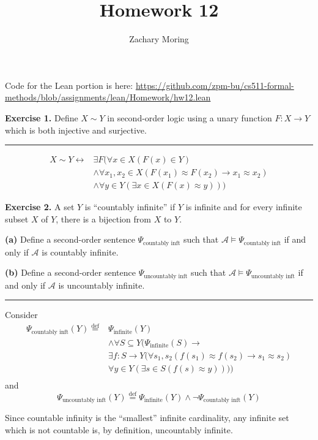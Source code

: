 \documentclass{article}
\title{Homework 12}
\author{Zachary Moring}
\newcommand{\Break}{\vspace{0.2cm}\hrule{}\vspace{0.2cm}}
\newcommand{\defas}{\overset{\text{def}}{=}}
\begin{document}
 \maketitle

Code for the Lean portion is here:
\url{https://github.com/zpm-bu/cs511-formal-methods/blob/assignments/lean/Homework/hw12.lean}

\vspace{2cm}

\noindent\textbf{Exercise 1.} Define $X \sim Y$ in second-order logic using a
unary function $F : X → Y$ which is both injective and surjective.

\Break{}

\begin{align*}
  X \sim Y \longleftrightarrow &\exists F (\forall x \in X (F(x) \in Y) \\
  &\wedge \forall x_1, x_2 \in X (F(x_1) \approx F(x_2) \to x_1 \approx x_2)\\
  &\wedge \forall y \in Y (\exists x \in X (F(x) \approx y)))
\end{align*}

\newpage{}

\noindent\textbf{Exercise 2.} A set $Y$ is ``countably infinite'' if $Y$ is
infinite and for every infinite subset $X$ of $Y$, there is a bijection from
$X$ to $Y$.

\textbf{(a)} Define a second-order sentence $\Psi_{\text{countably
inft}}$ such that $\mathcal{A} \vDash \Psi_{\text{countably inft}}$ if and only
if $\mathcal{A}$ is countably infinite.

\textbf{(b)} Define a second-order sentence $\Psi_{\text{uncountably
inft}}$ such that $\mathcal{A} \vDash \Psi_{\text{uncountably inft}}$ if and
only if $\mathcal{A}$ is uncountably infinite.

\Break{}

Consider
\begin{align*}
  \Psi_{\text{countably inft}}(Y) \defas &\Psi_{\text{infinite}}(Y) \\
  &\wedge \forall S \subseteq Y (\Psi_\text{infinite}(S) \to \\
  &\exists f : S \to Y (\forall s_1, s_2 (f(s_1) \approx f(s_2) \to s_1 \approx s_2) \\
  &\forall y \in Y (\exists s \in S (f(s) \approx y))))\\
\end{align*}
and
\[
  \Psi_\text{uncountably inft}(Y) \defas \Psi_\text{infinite}(Y) \wedge \lnot
  \Psi_\text{countably inft}(Y)
\]

Since countable infinity is the ``smallest'' infinite cardinality, any infinite
set which is not countable is, by definition, uncountably infinite.
\end{document}
